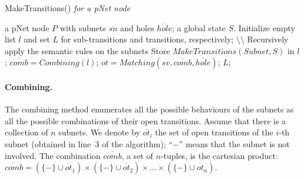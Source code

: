 \documentclass[smallcondensed]{svjour3}
\newcommand{\noteSB}[2][color=green!40, size=\tiny]{\todo[#1]{{\bf Simon: } {#2}}}
\begin{document}
\begin{algorithm}[h]
\caption{MakeTransitions() \em{for a pNet node}}
  \label{alg2}
\begin{algorithmic}[1]
\Require a pNet node $P$ with subnets $\overline{sn}$ and holes $\overline{hole}$; a global state $S$.
\State Initialize empty list $l$ and set $L$ for sub-transitions and transitions, respectively;
        \hfill $\setminus \setminus$ Recursively apply the semantic rules on the subnets
           \State Store $\mathit{MakeTransitions}(Subnet, S)$ in $l$;
	\EndFor
	\State $\overline{comb} = \mathit{Combining}(l)$;
           \State $ot = \mathit{Matching}(sv, \overline{\mathit{comb}}, \overline{\mathit{hole}})$;
	\EndFor
\State \Return $L$;
\end{algorithmic}  
\end{algorithm}



%
%


\def\inactive{\{-\}}
\paragraph{Combining.}
The combining method enumerates all the possible behaviours of the
subnets as all the possible combinations of their open transitions.
Assume that there is a collection of $n$ subnets.
We denote by $\overline{ot}_i$ the set of open
transitions of the $i$-th
subnet (obtained in line~3 of the algorithm); %
``$-$'' means that the subnet is not involved.
The combination $\overline{comb}$, a set of $n$-tuples, is the
cartesian product:  
$\overline{comb} = (\inactive\cup \overline{ot}_1) \times (\inactive\cup \overline{ot}_2)\times \dots \times (\inactive\cup \overline{ot}_n)$.
\end{document}
